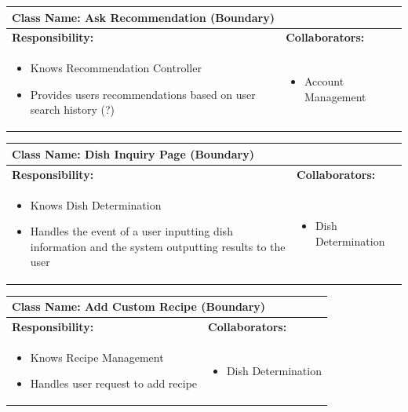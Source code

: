 \documentclass[]{article}
\begin{document}
\begin{table}[H]
	\centering
	\begin{tabular}{|p{7cm}|p{7cm}|}
	\hline 
	 \multicolumn{2}{|l|}{\textbf{Class Name:} Ask Recommendation (Boundary)} \\
	\hline
	\textbf{Responsibility:} & \textbf{Collaborators:} \\
	\hline
	\raggedright
	\begin{itemize}
		\item Knows Recommendation Controller
		\item Provides users recommendations based on user search history  (?)
	\end{itemize}
	\vspace{1in} & 
	\begin{itemize}
		\item Account Management
	\end{itemize} \\
	\hline
	\end{tabular}
\end{table}

\begin{table}[H]
	\centering
	\begin{tabular}{|p{7cm}|p{7cm}|}
	\hline 
	 \multicolumn{2}{|l|}{\textbf{Class Name:} Dish Inquiry Page (Boundary)} \\
	\hline
	\textbf{Responsibility:} & \textbf{Collaborators:} \\
	\hline
	\raggedright
	\begin{itemize}
		\item Knows Dish Determination
		\item Handles the event of a user inputting dish information and the system outputting results to the user
	\end{itemize}
	\vspace{1in} & 
	\begin{itemize}
		\item Dish Determination
	\end{itemize} \\
	\hline
	\end{tabular}
\end{table}

\begin{table}[H]
	\centering
	\begin{tabular}{|p{7cm}|p{7cm}|}
	\hline 
	 \multicolumn{2}{|l|}{\textbf{Class Name:} Add Custom Recipe (Boundary)} \\
	\hline
	\textbf{Responsibility:} & \textbf{Collaborators:} \\
	\hline
	\raggedright
	\begin{itemize}
		\item Knows Recipe Management
		\item Handles user request to add recipe
	\end{itemize}
	\vspace{1in} & 
	\begin{itemize}
		\item Dish Determination
	\end{itemize} \\
	\hline
	\end{tabular}
\end{table}
\end{document}
